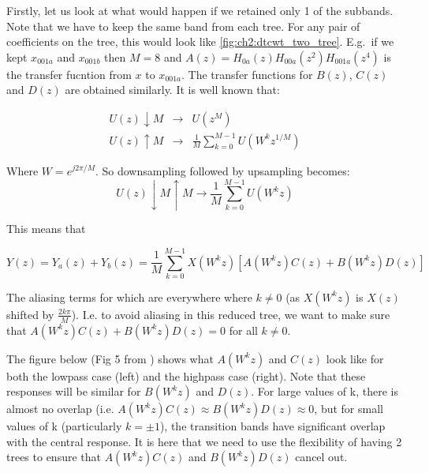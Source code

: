 \begin{figure}
  \centering
  \label{fig:ch2:dtcwt_two_tree}
\end{figure}

Firstly, let us look at what would happen if we retained only 1 of the subbands.
Note that we have to keep the same band from each tree. For any pair of
coefficients on the tree, this would look like \autoref{fig:ch2:dtcwt_two_tree}.
E.g.\ if we kept $x_{001a}$ and $x_{001b}$ then $M=8$ and $A(z) =
H_{0a}(z)H_{00a}(z^2)H_{001a}(z^4)$ is the transfer fucntion from $x$ to
$x_{001a}$. The transfer functions for $B(z)$, $C(z)$ and $D(z)$ are obtained
similarly. It is well known that:

\begin{eqnarray}
  U(z) \downarrow M &\rightarrow&  U(z^M) \\
  U(z) \uparrow M &\rightarrow & \frac{1}{M}\sum_{k=0}^{M-1}U(W^kz^{1/M})
\end{eqnarray}

Where $W=e^{j2\pi/M}$. So downsampling followed by upsampling becomes:
$$U(z) \downarrow M \uparrow M \rightarrow \frac{1}{M}\sum_{k=0}^{M-1}U(W^kz)$$

This means that

\begin{equation}
  Y(z) = Y_{a}(z) + Y_{b}(z) = \frac{1}{M} \sum_{k=0}^{M-1} X(W^k z) [A(W^kz)C(z) + B(W^kz)D(z)]
\end{equation}

The aliasing terms for which are everywhere where $k \neq 0$ (as $X(W^kz)$ is
$X(z)$ shifted by $\frac{2k\pi}{M}$). I.e. to avoid aliasing in this reduced
tree, we want to make sure that $A(W^kz)C(z) + B(W^kz)D(z) = 0$ for all $k \neq
0$.

The figure below (Fig 5 from \cite{kingsbury_complex_2001}) shows what $A(W^kz)$
and $C(z)$ look like for both the lowpass case (left) and the highpass case
(right). Note that these responses will be similar for $B(W^kz)$ and $D(z)$. For
large values of k, there is almost no overlap (i.e. 
$A(W^kz)C(z) \approx B(W^kz)D(z) \approx 0$, 
but for small values of k (particularly $k = \pm 1$),
the transition bands have significant overlap with the central response. It is
here that we need to use the flexibility of having 2 trees to ensure that
$A(W^kz)C(z)$ and $B(W^kz)D(z)$ cancel out.


